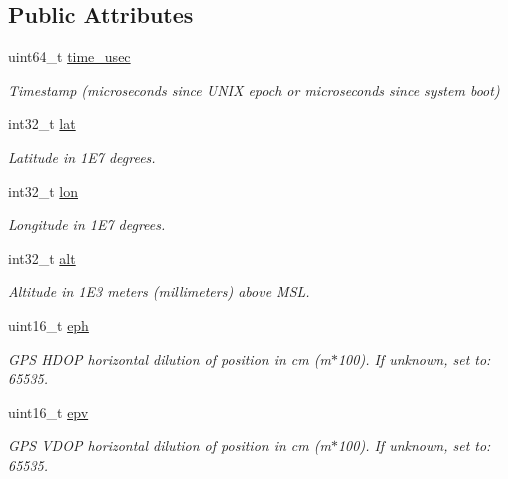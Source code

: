 \subsection*{Public Attributes}
\begin{DoxyCompactItemize}
\item 
\hypertarget{struct____mavlink__gps__raw__int__t_a39d30393d02f2b1882040e3fa063f6ea}{uint64\+\_\+t \hyperlink{struct____mavlink__gps__raw__int__t_a39d30393d02f2b1882040e3fa063f6ea}{time\+\_\+usec}}\label{struct____mavlink__gps__raw__int__t_a39d30393d02f2b1882040e3fa063f6ea}

\begin{DoxyCompactList}\small\item\em Timestamp (microseconds since U\+N\+I\+X epoch or microseconds since system boot) \end{DoxyCompactList}\item 
int32\+\_\+t \hyperlink{struct____mavlink__gps__raw__int__t_aefd27d0b2d23c58a59b218aa151220d3}{lat}
\begin{DoxyCompactList}\small\item\em Latitude in 1\+E7 degrees. \end{DoxyCompactList}\item 
int32\+\_\+t \hyperlink{struct____mavlink__gps__raw__int__t_a025fd2dd700ff7180af5a26c2a3497f4}{lon}
\begin{DoxyCompactList}\small\item\em Longitude in 1\+E7 degrees. \end{DoxyCompactList}\item 
int32\+\_\+t \hyperlink{struct____mavlink__gps__raw__int__t_a00fe92144cfdaf8440a841493e5b6e99}{alt}
\begin{DoxyCompactList}\small\item\em Altitude in 1\+E3 meters (millimeters) above M\+S\+L. \end{DoxyCompactList}\item 
uint16\+\_\+t \hyperlink{struct____mavlink__gps__raw__int__t_ad7ec0749ffe37d3ada65b701be2cd305}{eph}
\begin{DoxyCompactList}\small\item\em G\+P\+S H\+D\+O\+P horizontal dilution of position in cm (m$\ast$100). If unknown, set to\+: 65535. \end{DoxyCompactList}\item 
uint16\+\_\+t \hyperlink{struct____mavlink__gps__raw__int__t_a0d50bc6cc0e56d9f49885e3e550ec944}{epv}
\begin{DoxyCompactList}\small\item\em G\+P\+S V\+D\+O\+P horizontal dilution of position in cm (m$\ast$100). If unknown, set to\+: 65535. \end{DoxyCompactList}\item 

\end{DoxyCompactItemize}
